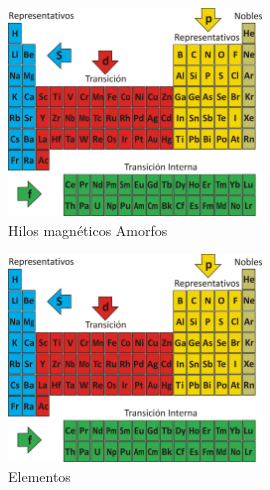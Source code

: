 \begin{figure}[H]
    \centering
    \includegraphics[width=0.6\textwidth]{./Figures/TablaPeriodica}
	\caption{Hilos magnéticos Amorfos}
	\label{fig:TablaPeriodicaXx}
\end{figure}

\begin{figure}[H]
    \centering
    \includegraphics[width=0.6\textwidth]{./Figures/TablaPeriodica}
	\caption{Elementos}
	\label{fig:TablaPeriodicaXx}
\end{figure}


